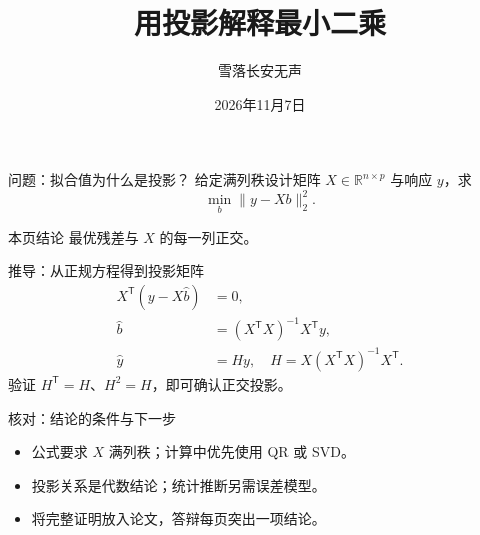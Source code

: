 \documentclass[aspectratio=169,10pt]{beamer}
\title{用投影解释最小二乘}
\author{雪落长安无声}
\date{2026年11月7日}
\begin{document}
\begin{frame}\titlepage\end{frame}
\begin{frame}{问题：拟合值为什么是投影？}
给定满列秩设计矩阵 $X\in\mathbb R^{n\times p}$ 与响应 $y$，求
\[
 \min_b\|y-Xb\|_2^2.
\]
\begin{block}{本页结论}
最优残差与 $X$ 的每一列正交。
\end{block}
\end{frame}
\begin{frame}{推导：从正规方程得到投影矩阵}
\begin{align*}
 X^{\mathsf T}(y-X\hat b)&=0,\\
 \hat b&=(X^{\mathsf T}X)^{-1}X^{\mathsf T}y,\\
 \hat y&=Hy,\quad H=X(X^{\mathsf T}X)^{-1}X^{\mathsf T}.
\end{align*}
\pause
验证 $H^{\mathsf T}=H$、$H^2=H$，即可确认正交投影。
\end{frame}
\begin{frame}{核对：结论的条件与下一步}
\begin{itemize}
\item 公式要求 $X$ 满列秩；计算中优先使用 QR 或 SVD。
\item 投影关系是代数结论；统计推断另需误差模型。
\item 将完整证明放入论文，答辩每页突出一项结论。
\end{itemize}
\end{frame}
\end{document}
